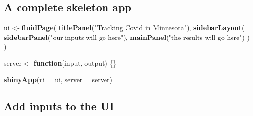 \documentclass[
]{book}
\newenvironment{Shaded}{\begin{snugshade}}{\end{snugshade}}
\newcommand{\AttributeTok}[1]{\textcolor[rgb]{0.13,0.29,0.53}{#1}}
\newcommand{\ControlFlowTok}[1]{\textcolor[rgb]{0.13,0.29,0.53}{\textbf{#1}}}
\newcommand{\FunctionTok}[1]{\textcolor[rgb]{0.13,0.29,0.53}{\textbf{#1}}}
\newcommand{\NormalTok}[1]{#1}
\newcommand{\OtherTok}[1]{\textcolor[rgb]{0.56,0.35,0.01}{#1}}
\newcommand{\StringTok}[1]{\textcolor[rgb]{0.31,0.60,0.02}{#1}}
\begin{document}
\hypertarget{a-complete-skeleton-app}{%
\subsection{A complete skeleton app}\label{a-complete-skeleton-app}}

\begin{Shaded}
\begin{Highlighting}[]
\NormalTok{ui }\OtherTok{\textless{}{-}} \FunctionTok{fluidPage}\NormalTok{(}
  \FunctionTok{titlePanel}\NormalTok{(}\StringTok{"Tracking Covid in Minnesota"}\NormalTok{),}
  \FunctionTok{sidebarLayout}\NormalTok{(}
    \FunctionTok{sidebarPanel}\NormalTok{(}\StringTok{"our inputs will go here"}\NormalTok{),}
    \FunctionTok{mainPanel}\NormalTok{(}\StringTok{"the results will go here"}\NormalTok{)}
\NormalTok{  )}
\NormalTok{)}

\NormalTok{server }\OtherTok{\textless{}{-}} \ControlFlowTok{function}\NormalTok{(input, output) \{\}}

\FunctionTok{shinyApp}\NormalTok{(}\AttributeTok{ui =}\NormalTok{ ui, }\AttributeTok{server =}\NormalTok{ server)}
\end{Highlighting}
\end{Shaded}

\hypertarget{add-inputs-to-the-ui}{%
\subsection{Add inputs to the UI}\label{add-inputs-to-the-ui}}
\end{document}
